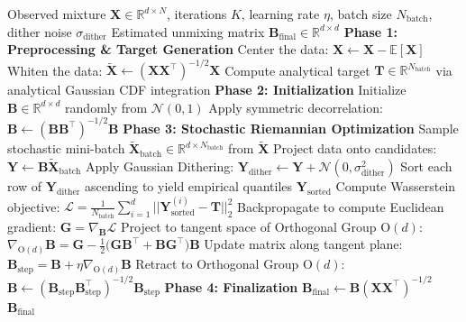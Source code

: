 \documentclass{tpm2026} %
\begin{document}
\begin{algorithm}[htbp]
\caption{The Optimal Transport ICA (OT-ICA) Algorithm}
\label{alg:ot_ica}
\begin{algorithmic}[1]
\Require Observed mixture $\mathbf{X} \in \mathbb{R}^{d \times N}$, iterations $K$, learning rate $\eta$, batch size $N_{\text{batch}}$, dither noise $\sigma_{\text{dither}}$
\Ensure Estimated unmixing matrix $\mathbf{B}_{\text{final}} \in \mathbb{R}^{d \times d}$
\State \textbf{Phase 1: Preprocessing \& Target Generation}
\State Center the data: $\mathbf{X} \gets \mathbf{X} - \mathbb{E}[\mathbf{X}]$
\State Whiten the data: $\widetilde{\mathbf{X}} \gets (\mathbf{X}\mathbf{X}^\top)^{-1/2} \mathbf{X}$
\State Compute analytical target $\mathbf{T} \in \mathbb{R}^{N_{\text{batch}}}$ via analytical Gaussian CDF integration
\State \textbf{Phase 2: Initialization}
\State Initialize $\mathbf{B} \in \mathbb{R}^{d \times d}$ randomly from $\mathcal{N}(0,1)$
\State Apply symmetric decorrelation: $\mathbf{B} \gets (\mathbf{B}\mathbf{B}^\top)^{-1/2} \mathbf{B}$
\State \textbf{Phase 3: Stochastic Riemannian Optimization}
    \State Sample stochastic mini-batch $\widetilde{\mathbf{X}}_{\text{batch}} \in \mathbb{R}^{d \times N_{\text{batch}}}$ from $\widetilde{\mathbf{X}}$
    \State Project data onto candidates: $\mathbf{Y} \gets \mathbf{B} \widetilde{\mathbf{X}}_{\text{batch}}$
    \State Apply Gaussian Dithering: $\mathbf{Y}_{\text{dither}} \gets \mathbf{Y} + \mathcal{N}(0, \sigma_{\text{dither}}^2)$
    \State Sort each row of $\mathbf{Y}_{\text{dither}}$ ascending to yield empirical quantiles $\mathbf{Y}_{\text{sorted}}$
    \State Compute Wasserstein objective: $\mathcal{L} = \frac{1}{N_{\text{batch}}} \sum_{i=1}^{d} ||\mathbf{Y}_{\text{sorted}}^{(i)} - \mathbf{T}||_2^2$
    \State Backpropagate to compute Euclidean gradient: $\mathbf{G} = \nabla_{\mathbf{B}} \mathcal{L}$
    \State Project to tangent space of Orthogonal Group $\mathrm{O}(d)$: $\nabla_{\mathrm{O}(d)} \mathbf{B} = \mathbf{G} - \frac{1}{2}\big(\mathbf{G}\mathbf{B}^\top + \mathbf{B}\mathbf{G}^\top \big)\mathbf{B}$
    \State Update matrix along tangent plane: $\mathbf{B}_{\text{step}} = \mathbf{B} + \eta \nabla_{\mathrm{O}(d)} \mathbf{B}$
    \State Retract to Orthogonal Group $\mathrm{O}(d)$: $\mathbf{B} \gets (\mathbf{B}_{\text{step}}\mathbf{B}_{\text{step}}^\top)^{-1/2} \mathbf{B}_{\text{step}}$
\EndFor
\State \textbf{Phase 4: Finalization}
\State $\mathbf{B}_{\text{final}} \gets \mathbf{B} (\mathbf{X}\mathbf{X}^\top)^{-1/2}$ 
\State \Return $\mathbf{B}_{\text{final}}$
\end{algorithmic}
\end{algorithm}
\end{document}
